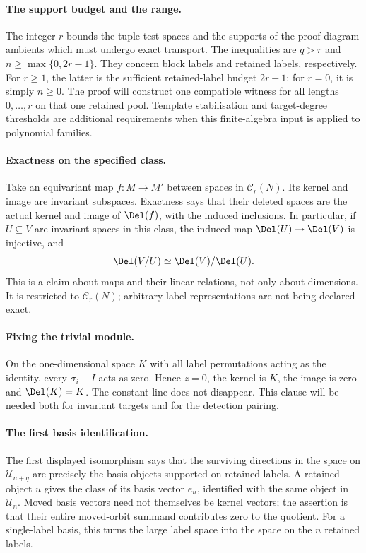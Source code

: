 \documentclass[11pt,a4paper,oneside,openany]{book}
\theoremstyle{definition}\newtheorem{definition}[theorem]{Definition}
\theoremstyle{remark}\newtheorem{remark}[theorem]{Remark}
\numberwithin{equation}{chapter}
\begin{document}
\paragraph{The support budget and the range.}
The integer $r$ bounds the tuple test spaces and the supports of the
proof-diagram ambients which must undergo exact transport.
The inequalities are $q>r$ and $n\ge\max\{0,2r-1\}$.
They concern block labels and retained labels, respectively. For
$r\ge1$, the latter is the sufficient retained-label budget
$2r-1$; for $r=0$, it is simply $n\ge0$. The proof will construct
one compatible witness for all lengths $0,\ldots,r$ on that one
retained pool. Template stabilisation and target-degree thresholds
are additional requirements when this finite-algebra input is
applied to polynomial families.

\paragraph{Exactness on the specified class.}
Take an equivariant map $f:M\to M'$ between spaces in
$\mathcal C_r(N)$. Its kernel and image are invariant subspaces.
Exactness says that their deleted spaces are the actual kernel and
image of $\Del(f)$, with the induced inclusions. In particular,
if $U\subseteq V$ are invariant spaces in this class, the induced
map $\Del(U)\to\Del(V)$ is injective, and
\[
                  \Del(V/U)\simeq\Del(V)/\Del(U).
\]
This is a claim about maps and their linear relations, not only
about dimensions. It is restricted to $\mathcal C_r(N)$;
arbitrary label representations are not being declared exact.

\paragraph{Fixing the trivial module.}
On the one-dimensional space $K$ with all label permutations acting
as the identity, every $\sigma_i-I$ acts as zero. Hence $z=0$,
the kernel is $K$, the image is zero and $\Del(K)=K$.
The constant line does not disappear. This clause will be needed
both for invariant targets and for the detection pairing.

\paragraph{The first basis identification.}
The first displayed isomorphism says that the surviving directions
in the space on $\mathcal U_{n+q}$ are precisely the basis
objects supported on retained labels. A retained object $u$ gives
the class of its basis vector $e_u$, identified with the same
object in $\mathcal U_n$. Moved basis vectors need not themselves
be kernel vectors; the assertion is that their entire moved-orbit
summand contributes zero to the quotient. For a single-label basis,
this turns the large label space into the space on the $n$
retained labels.
\end{document}
